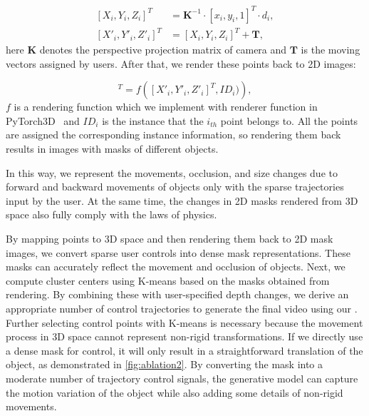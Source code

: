 \vspace{-10pt}
\begin{equation}
    \begin{split}
        [X_i, Y_i, Z_i]^T &= \mathbf{K}^{-1} \cdot [x_i, y_i, 1]^T \cdot d_i, \\
        [X'_i, Y'_i, Z'_i]^T &= [X_i, Y_i, Z_i]^T + \mathbf{T},
    \end{split}
\end{equation}
here $\mathbf{K}$ denotes the perspective projection matrix of camera and $\mathbf{T}$ is the moving vectors assigned by users. After that, we render these points back to 2D images: 

\vspace{-5pt}
\begin{equation}
    [x_i, y_i]^T = f\left ( [X'_i, Y'_i, Z'_i]^T, {ID}_i) \right ),
\end{equation}
$f$ is a rendering function which we implement with renderer function in PyTorch3D~\cite{pytorch3d} and $ID_i$ is the instance that the $i_{th}$ point belongs to. All the points are assigned the corresponding instance information, so rendering them back results in images with masks of different objects.

In this way, we represent the movements, occlusion, and size changes due to forward and backward movements of objects only with the sparse trajectories input by the user. At the same time, the changes in 2D masks rendered from 3D space also fully comply with the laws of physics.

By mapping points to 3D space and then rendering them back to 2D mask images, we convert sparse user controls into dense mask representations. These masks can accurately reflect the movement and occlusion of objects. Next, we compute cluster centers using K-means based on the masks obtained from rendering. By combining these with user-specified depth changes, we derive an appropriate number of control trajectories to generate the final video using our \method. Further selecting control points with K-means is necessary because the movement process in 3D space cannot represent non-rigid transformations. If we directly use a dense mask for control, it will only result in a straightforward translation of the object, as demonstrated in \cref{fig:ablation2}. By converting the mask into a moderate number of trajectory control signals, the generative model can capture the motion variation of the object while also adding some details of non-rigid movements.